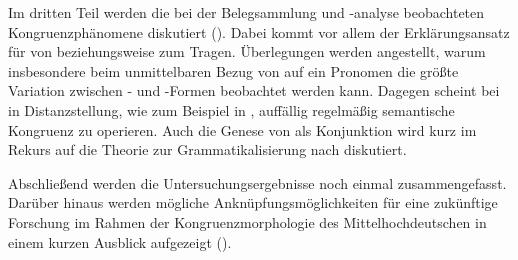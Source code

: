 Im dritten Teil werden die bei der Belegsammlung und -analyse beobachteten
Kongruenzphänomene diskutiert (). Dabei kommt vor allem
der Erklärungsansatz für  von
\citet[171--195]{wechslerzlatic2003} beziehungsweise \citet{wechsler2009} zum
Tragen. Überlegungen werden angestellt, warum insbesondere beim unmittelbaren
Bezug von  auf ein Pronomen die größte Variation zwischen
- und -\allowbreak{}Formen beobachtet werden kann.
Dagegen scheint bei  in Dis\-tanz\-stellung, wie zum Beispiel in
, auffällig regelmäßig
semantische Kongruenz zu operieren. Auch die Genese von  als
Konjunktion wird kurz im Rekurs auf die Theorie zur Grammatikalisierung nach
\citet{lehmann2015} diskutiert.

Abschließend werden die Untersuchungsergebnisse noch einmal zusammengefasst.
Darüber hinaus werden mögliche Anknüpfungsmöglichkeiten für eine zukünftige
Forschung im Rahmen der Kongruenzmorphologie des
Mittel\-hoch\-deutschen in einem kurzen Ausblick
aufgezeigt ().
